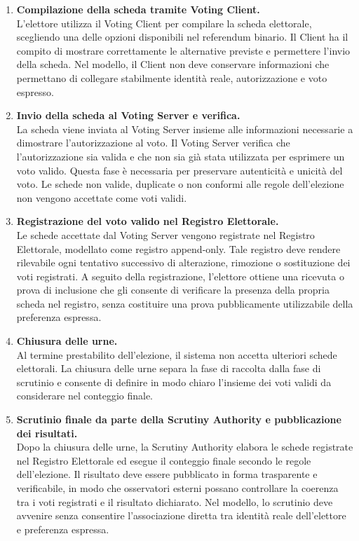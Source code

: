 \documentclass[a4paper,12pt]{article}
\begin{document}
\begin{enumerate}
            \item \textbf{Compilazione della scheda tramite Voting Client.}\\
            L'elettore utilizza il Voting Client per compilare la scheda elettorale, scegliendo una delle opzioni disponibili nel referendum binario. 
            Il Client ha il compito di mostrare correttamente le alternative previste e permettere l'invio della scheda. 
            Nel modello, il Client non deve conservare informazioni che permettano di collegare stabilmente identità reale, autorizzazione e voto espresso.

            \item \textbf{Invio della scheda al Voting Server e verifica.}\\
            La scheda viene inviata al Voting Server insieme alle informazioni necessarie a dimostrare l'autorizzazione al voto. 
            Il Voting Server verifica che l'autorizzazione sia valida e che non sia già stata utilizzata per esprimere un voto valido. 
            Questa fase è necessaria per preservare autenticità e unicità del voto. 
            Le schede non valide, duplicate o non conformi alle regole dell'elezione non vengono accettate come voti validi.

            \item \textbf{Registrazione del voto valido nel Registro Elettorale.}\\
            Le schede accettate dal Voting Server vengono registrate nel Registro Elettorale, modellato come registro append-only. 
            Tale registro deve rendere rilevabile ogni tentativo successivo di alterazione, rimozione o sostituzione dei voti registrati. 
            A seguito della registrazione, l'elettore ottiene una ricevuta o prova di inclusione che gli consente di verificare la presenza della propria scheda nel registro, senza costituire una prova pubblicamente utilizzabile della preferenza espressa.

            \item \textbf{Chiusura delle urne.}\\
            Al termine prestabilito dell'elezione, il sistema non accetta ulteriori schede elettorali. 
            La chiusura delle urne separa la fase di raccolta dalla fase di scrutinio e consente di definire in modo chiaro l'insieme dei voti validi da considerare nel conteggio finale.

            \item \textbf{Scrutinio finale da parte della Scrutiny Authority e pubblicazione dei risultati.}\\
            Dopo la chiusura delle urne, la Scrutiny Authority elabora le schede registrate nel Registro Elettorale ed esegue il conteggio finale secondo le regole dell'elezione. 
            Il risultato deve essere pubblicato in forma trasparente e verificabile, in modo che osservatori esterni possano controllare la coerenza tra i voti registrati e il risultato dichiarato. 
            Nel modello, lo scrutinio deve avvenire senza consentire l'associazione diretta tra identità reale dell'elettore e preferenza espressa.

        \end{enumerate}
\end{document}
